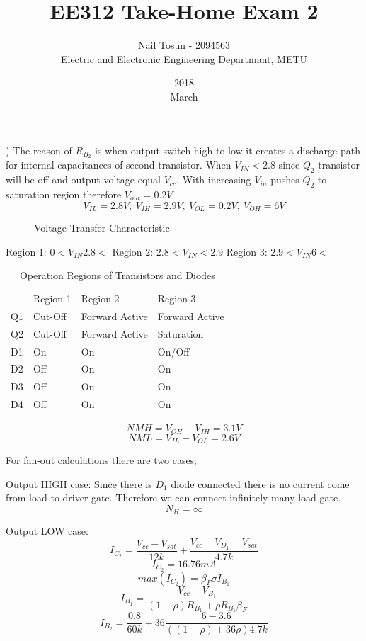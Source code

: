 \documentclass[11 pt]{article}
\title{EE312 Take-Home Exam 2}
\date{2018\\ March}
\author{Nail Tosun - 2094563 \\ Electric and Electronic Engineering Departmant, METU}
\begin{document}
)
The reason of $R_{B_2}$ is when output switch high to low  it creates a discharge path for internal capacitances of second transistor.
When $V_{IN}<2.8$ since $Q_2$ transistor will be off and output voltage equal $V_{cc}$. With increasing $V_{in}$ pushes $Q_2$ to saturation region therefore $V_{out}=0.2V$
$$V_{IL}=2.8V, \> V_{IH} = 2.9V, \> V_{OL}=0.2V, \>
V_{OH}=6V$$
\begin{figure}[H]
\centering
{}
\caption{Voltage Transfer Characteristic}
\end{figure}
Region 1: $0<V_{IN}2.8<$
Region 2: $2.8<V_{IN}<2.9$
Region 3: $2.9<V_{IN}6<$
\begin{table}[H]
\centering
\caption{Operation Regions of Transistors and Diodes}
\label{my-label}
\begin{tabular}{llll}
   & Region 1 & Region 2       & Region 3       \\
Q1 & Cut-Off  & Forward Active & Forward Active \\
Q2 & Cut-Off  & Forward Active & Saturation     \\
D1 & On       & On             & On/Off         \\
D2 & Off      & On             & On             \\
D3 & Off      & On             & On             \\
D4 & Off      & On             & On            
\end{tabular}
\end{table}

$$NMH=V_{OH}-V_{IH}= 3.1V$$
$$NML=V_{IL}-V_{OL}= 2.6V$$

For fan-out calculations there are two cases;

Output HIGH case: Since there is $D_1$ diode connected there is no current come from load to driver gate. Therefore we can connect infinitely many load gate.
$$N_H=\infty$$ 

Output LOW case: 
$$I_{C_2}=\frac{V_{cc}-V_{sat}}{12k}+\frac{V_{cc}-V_{D_1}-V_{sat}}{4.7k}$$
$$I_{C_2}=16.76 mA$$
$$max(I_{C_2})=\beta_F \sigma I_{B_1}$$
$$I_{B_1}=\frac{V_{cc}-V_{B_1}}{(1-\rho)R_{B_1}+\rho R_{B_1} \beta_F}$$
$$I_{B_2}=\frac{0.8}{60k} + 36\frac{6-3.6}{((1-\rho)+36\rho )4.7k }$$
\end{document}
